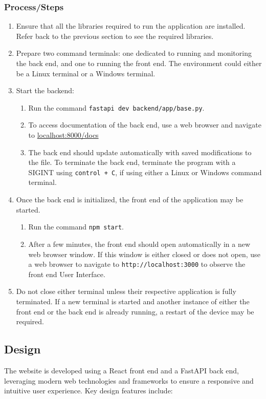 \documentclass{article}
\begin{document}
\subsubsection{Process/Steps}
\begin{enumerate}
    \item Ensure that all the libraries required to run the application are installed. Refer back to the previous section to see the required libraries.
    \item Prepare two command terminals: one dedicated to running and monitoring the back end, and one to running the front end. The environment could either be a Linux terminal or a Windows terminal.
    \item Start the backend:
    \begin{enumerate}
        \item Run the command \texttt{fastapi dev backend/app/base.py}.
        \item To access documentation of the back end, use a web browser and navigate to \url{localhost:8000/docs}
        \item The back end should update automatically with saved modifications to the file. To terminate the back end, terminate the program with a SIGINT using \texttt{control + C}, if using either a Linux or Windows command terminal.
    \end{enumerate}
    \item Once the back end is initialized, the front end of the application may be started.
    \begin{enumerate}
        \item Run the command \texttt{npm start}.
        \item After a few minutes, the front end should open automatically in a new web browser window. If this window is either closed or does not open, use a web browser to navigate to \texttt{http://localhost:3000} to observe the front end User Interface.
    \end{enumerate}
    \item Do not close either terminal unless their respective application is fully terminated. If a new terminal is started and another instance of either the front end or the back end is already running, a restart of the device may be required.
\end{enumerate}

\subsection{Design}
The website is developed using a React front end and a FastAPI back end, leveraging modern web technologies and frameworks to ensure a responsive and intuitive user experience. Key design features include:
\end{document}
